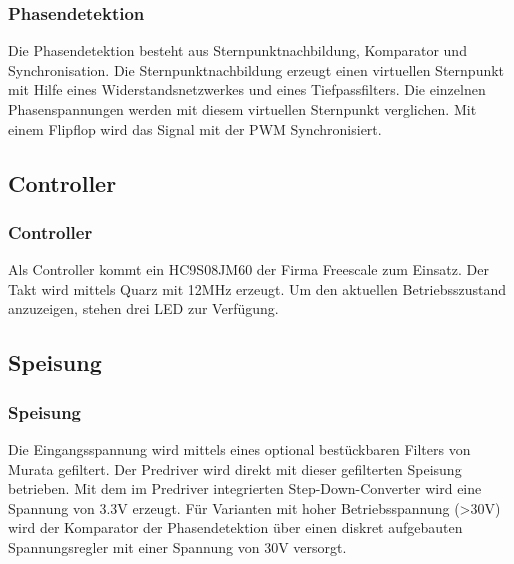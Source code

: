 \subsubsection{Phasendetektion}
\fi
Die Phasendetektion besteht aus Sternpunktnachbildung, Komparator und 
Synchronisation. Die Sternpunktnachbildung erzeugt einen virtuellen Sternpunkt 
mit Hilfe eines Widerstandsnetzwerkes und eines Tiefpassfilters. Die einzelnen 
Phasenspannungen werden mit diesem virtuellen Sternpunkt verglichen. Mit einem 
Flipflop wird das Signal mit der PWM Synchronisiert. 

\ifSTANDALONE
\subsection{Controller}
\fi
\ifEMBED
\subsubsection{Controller}
\fi
Als Controller kommt ein HC9S08JM60 der Firma Freescale zum Einsatz. Der Takt 
wird mittels Quarz mit 12MHz erzeugt. Um den aktuellen Betriebsszustand 
anzuzeigen, stehen drei LED zur Verfügung. 

\ifSTANDALONE
\subsection{Speisung}
\fi
\ifEMBED
\subsubsection{Speisung}
\fi
Die Eingangsspannung wird mittels eines optional bestückbaren Filters von 
Murata gefiltert. Der Predriver wird direkt mit dieser gefilterten Speisung 
betrieben. Mit dem im Predriver integrierten Step-Down-Converter wird eine 
Spannung von 3.3V erzeugt. Für Varianten mit hoher Betriebsspannung (>30V) 
wird der Komparator der Phasendetektion über einen diskret aufgebauten 
Spannungsregler mit einer Spannung von 30V versorgt. 

